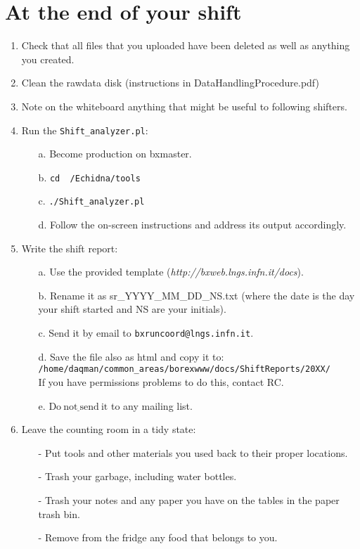 \documentclass[a4paper,11pt]{article}
\begin{document}
\section*{At the end of your shift}
\begin{enumerate}
\item Check that all files that you uploaded have been deleted as well as anything you created.
\item Clean the rawdata disk (instructions in DataHandlingProcedure.pdf)
\item Note on the whiteboard anything that might be useful to following shifters.
\item Run the {\small{\texttt{Shift\_analyzer.pl}}}:
\begin{itemize}
 \item[a. ] Become production on bxmaster.
 \item[b. ] {\small{\texttt{cd ~/Echidna/tools}}}
 \item[c. ] {\small{\texttt{./Shift\_analyzer.pl}}}
 \item[d. ] Follow the on-screen instructions and address its output accordingly.
\end{itemize}

\item Write the shift report:
\begin{itemize}
 \item[a. ] Use the provided template (\textit{http://bxweb.lngs.infn.it/docs}).
 \item[b. ] Rename it as sr\_YYYY\_MM\_DD\_NS.txt (where the date is the day your shift started and NS are your initials).
 \item[c. ] Send it by email to {\small{\texttt{bxruncoord@lngs.infn.it}}}.
 \item[d. ] Save the file also as html and copy it to: \\
 {\small{\texttt{/home/daqman/common\_areas/borexwww/docs/ShiftReports/20XX/}}} \\
 If you have permissions problems to do this, contact RC.
 \item[e. ] $\underline{\mathrm{Do~not~send~it}}$ to any mailing list.
\end{itemize}

\item Leave the counting room in a tidy state:
\begin{itemize}
 \item[-  ] Put tools and other materials you used back to their proper locations.
 \item[-  ] Trash your garbage, including water bottles.
 \item[-  ] Trash your notes and any paper you have on the tables in the paper trash bin.
 \item[-  ] Remove from the fridge any food that belongs to you.
\end{itemize} 
\end{enumerate} 
\end{document}
